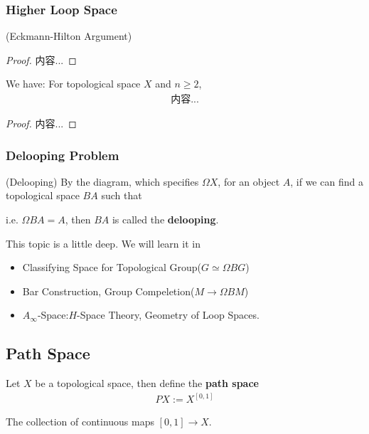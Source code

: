 \documentclass[Total.tex]{subfiles}
\begin{document}
				\subsubsection{Higher Loop Space}
				
					\begin{lemma}
						(Eckmann-Hilton Argument)
					\end{lemma}
					\begin{proof}
						内容...
					\end{proof}
					
					\begin{corollary}
						We have: For topological space $X$ and $n\geq 2$,
						\begin{gather*}
							内容...
						\end{gather*}
					\end{corollary}
					\begin{proof}
						内容...
					\end{proof}
				\subsubsection{Delooping Problem}
					\begin{Def}
						(Delooping) By the diagram, which specifies $\Omega X$, for an object $A$, if we can find a topological space $BA$ such that
						\begin{center}
						\end{center}
						
						i.e. $\Omega BA=A$, then $BA$ is called the \textbf{delooping}.
					\end{Def}
					
					This topic is a little deep. We will learn it in
					\begin{itemize}
						\item Classifying Space for Topological Group($G\simeq \Omega BG$)
						\item Bar Construction, Group Compeletion($M\rightarrow \Omega BM$)
						\item $A_\infty$-Space:$H$-Space Theory, Geometry of Loop Spaces. 
					\end{itemize}
			\subsection{Path Space}
				\begin{Def}
					Let $X$ be a topological space, then define the \textbf{path space}
					\begin{gather*}
						PX:=X^{[0,1]}
					\end{gather*}
					
					The collection of continuous maps $[0,1]\rightarrow X$.
				\end{Def}
				
\end{document}
